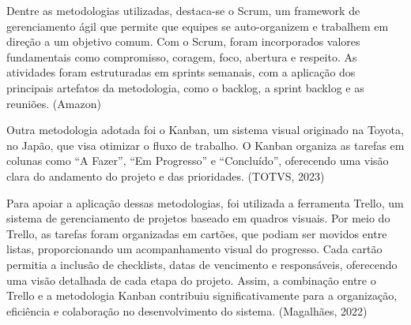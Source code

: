 Dentre as metodologias utilizadas, destaca-se o Scrum, um framework de gerenciamento ágil
que permite que equipes se auto-organizem e trabalhem em direção a um objetivo comum.
Com o Scrum, foram incorporados valores fundamentais como compromisso, coragem, foco,
abertura e respeito. As atividades foram estruturadas em sprints semanais, com a aplicação
dos principais artefatos da metodologia, como o backlog, a sprint backlog e as reuniões.
(Amazon)

Outra metodologia adotada foi o Kanban, um sistema visual originado na Toyota, no Japão,
que visa otimizar o fluxo de trabalho. O Kanban organiza as tarefas em colunas como “A
Fazer”, “Em Progresso” e “Concluído”, oferecendo uma visão clara do andamento do projeto e
das prioridades. (TOTVS, 2023)

Para apoiar a aplicação dessas metodologias, foi utilizada a ferramenta Trello, um sistema de
gerenciamento de projetos baseado em quadros visuais. Por meio do Trello, as tarefas foram
organizadas em cartões, que podiam ser movidos entre listas, proporcionando um
acompanhamento visual do progresso. Cada cartão permitia a inclusão de checklists, datas
de vencimento e responsáveis, oferecendo uma visão detalhada de cada etapa do projeto.
Assim, a combinação entre o Trello e a metodologia Kanban contribuiu significativamente
para a organização, eficiência e colaboração no desenvolvimento do sistema. (Magalhães,
2022)
